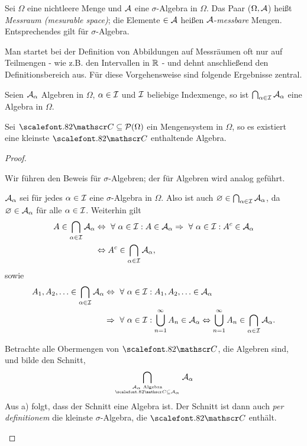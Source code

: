 \begin{defn}
\label{defn:1.2}
Sei $\Omega $ eine nichtleere Menge und $\AA$ eine $\sigma$-Algebra in $\Omega$.
Das Paar ($\Omega,\AA$) heißt \emph{Messraum (mesurable space)}; die Elemente
$\in \AA$ heißen $\AA$-\emph{messbare} Mengen.\\
Entsprechendes gilt für $\sigma$-Algebra.\fishhere
\end{defn}

Man startet bei der Definition von Abbildungen auf Messräumen oft nur
auf Teilmengen - wie z.B. den Intervallen in $\R$ - und dehnt anschließend den
Definitionsbereich aus. Für diese Vorgehensweise sind folgende Ergebnisse
zentral.

\begin{lem}
\label{lem:1.2}
\begin{propenum}
  \item Seien $\AA_\alpha$ Algebren in $\Omega$,  $\alpha\in \II$ und $\II$
  beliebige Indexmenge, so ist $\bigcap_{\alpha\in\II} \AA_\alpha$ eine Algebra
  in $\Omega$.
  \item Sei $\CC\subseteq \PP(\Omega)$ ein Mengensystem in $\Omega$,
  so es existiert eine kleinste $\CC$ enthaltende Algebra.\fishhere
\end{propenum}
\end{lem}
\begin{proof}
\begin{proofenum}
\item
Wir führen den Beweis für $\sigma$-Algebren; der für Algebren wird analog
geführt.

  $\AA_\alpha$ sei für jedes $\alpha\in\II$ eine $\sigma$-Algebra in
  $\Omega$. Also ist auch $\varnothing\in \bigcap_{\alpha\in \II} \AA_\alpha$,
  da $\varnothing\in \AA_\alpha$ für alle $\alpha\in\II$. Weiterhin gilt
\begin{align*}
A\in \bigcap_{\alpha\in\II} \AA_\alpha &\Leftrightarrow \forall \alpha\in\II :
A\in \AA_\alpha \Rightarrow \forall \alpha\in\II : A^c\in\AA_\alpha\\
&\Leftrightarrow A^c\in \bigcap_{\alpha\in\II} \AA_\alpha,
\end{align*}
sowie
\begin{align*}
A_1,A_2,\ldots \in \bigcap_{\alpha\in\II} \AA_\alpha &
\Leftrightarrow \forall \alpha\in \II : A_1,A_2,\ldots\in \AA_\alpha \\
&\Rightarrow \forall \alpha\in\II : \bigcup_{n=1}^\infty A_n \in \AA_\alpha 
\Leftrightarrow \bigcup_{n=1}^\infty A_n \in \bigcap_{\alpha\in\II} \AA_\alpha.
\end{align*}
\item Betrachte alle Obermengen von $\CC$, die Algebren sind,
  und bilde den Schnitt,
\begin{align*}
\bigcap_{\atop{\AA_\alpha\text{ Algebra}}{\CC\subseteq\AA_\alpha}} \AA_\alpha
\end{align*}
Aus a) folgt, dass der Schnitt eine Algebra ist. Der Schnitt ist dann
auch \textit{per definitionem} die kleinste $\sigma$-Algebra, die $\CC$
enthält.\qedhere
\end{proofenum}
\end{proof}

